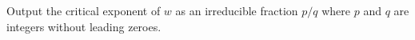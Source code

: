 Output the critical exponent of $w$ as an irreducible fraction $p/q$ where $p$ and $q$ are integers without leading zeroes.